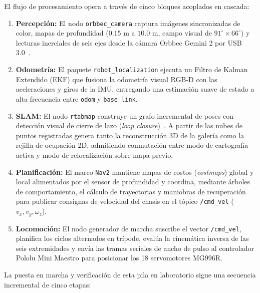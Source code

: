 El flujo de procesamiento opera a través de cinco bloques acoplados en cascada:

\begin{enumerate}
    \item \textbf{Percepción:} El nodo \texttt{orbbec\_camera} captura imágenes sincronizadas de color, mapas de profundidad ($0.15\text{ m}$ a $10.0\text{ m}$, campo visual de $91^\circ \times 66^\circ$) y lecturas inerciales de seis ejes desde la cámara Orbbec Gemini 2 por USB 3.0~\cite{Orbbec_Gemini2_Datasheet}.
    \item \textbf{Odometría:} El paquete \texttt{robot\_localization} ejecuta un Filtro de Kalman Extendido (EKF) que fusiona la odometría visual RGB-D con las aceleraciones y giros de la IMU, entregando una estimación suave de estado a alta frecuencia entre \texttt{odom} y \texttt{base\_link}.
    \item \textbf{SLAM:} El nodo \texttt{rtabmap} construye un grafo incremental de poses con detección visual de cierre de lazo (\textit{loop closure})~\cite{cadena2016past}. A partir de las nubes de puntos registradas genera tanto la reconstrucción 3D de la galería como la rejilla de ocupación 2D, admitiendo conmutación entre modo de cartografía activa y modo de relocalización sobre mapa previo.
    \item \textbf{Planificación:} El marco \texttt{Nav2} mantiene mapas de costos (\textit{costmaps}) global y local alimentados por el sensor de profundidad y coordina, mediante árboles de comportamiento, el cálculo de trayectorias y maniobras de recuperación para publicar consignas de velocidad del chasis en el tópico \texttt{/cmd\_vel} ($v_x, v_y, \omega_z$).
    \item \textbf{Locomoción:} El nodo generador de marcha suscribe el vector \texttt{/cmd\_vel}, planifica los ciclos alternados en trípode, evalúa la cinemática inversa de las seis extremidades y envía las tramas seriales de ancho de pulso al controlador Pololu Mini Maestro para posicionar los 18 servomotores MG996R.
\end{enumerate}

La puesta en marcha y verificación de esta pila en laboratorio sigue una secuencia incremental de cinco etapas:

